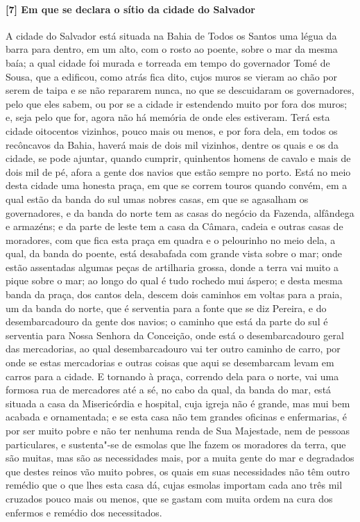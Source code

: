 \paragraph{[7] Em que se declara o sítio da cidade do Salvador} \quad
A cidade do Salvador está situada na Bahia de Todos os Santos uma légua da barra para
dentro, em um alto, com o rosto ao poente, sobre o mar da mesma baía; a qual cidade foi
murada e torreada em tempo do governador Tomé de Sousa, que a edificou, como atrás fica
dito, cujos muros se vieram ao chão por serem de taipa e se não repararem nunca, no que se
descuidaram os governadores, pelo que eles sabem, ou por se a cidade ir estendendo muito
por fora dos muros; e, seja pelo que for, agora não há memória de onde eles estiveram.
Terá esta cidade oitocentos vizinhos, pouco mais ou menos, e por fora dela, em todos os
recôncavos da Bahia, haverá mais de dois mil vizinhos, dentre os quais e os da cidade, se
pode ajuntar, quando cumprir, quinhentos homens de cavalo e mais de dois mil de pé, afora
a gente dos navios que estão sempre no porto. Está no meio desta cidade uma honesta praça,
em que se correm touros quando convém, em a qual estão da banda do sul umas nobres casas,
em que se agasalham os governadores, e da banda do norte tem as casas do negócio da
Fazenda, alfândega e armazéns; e da parte de leste tem a casa da Câmara, cadeia e outras
casas de moradores, com que fica esta praça em quadra e o pelourinho no meio dela, a qual,
da banda do poente, está desabafada com grande vista sobre o mar; onde estão assentadas
algumas peças de artilharia grossa, donde a terra vai muito a pique sobre o mar; ao longo
do qual é tudo rochedo mui áspero; e desta mesma banda da praça, dos cantos dela, descem
dois caminhos em voltas para a praia, um da banda do norte, que é serventia para a fonte
que se diz Pereira, e do desembarcadouro da gente dos navios; o caminho que está da parte
do sul é serventia para Nossa Senhora da Conceição, onde está o desembarcadouro geral das
mercadorias, ao qual desembarcadouro vai ter outro caminho de carro, por onde se estas
mercadorias e outras coisas que aqui se desembarcam levam em carros para a cidade. E
tornando à praça, correndo dela para o norte, vai uma formosa rua de mercadores até a sé,
no cabo da qual, da banda do mar, está situada a casa da Misericórdia e hospital, cuja
igreja não é grande, mas mui bem acabada e ornamentada; e se esta casa não tem grandes
oficinas e enfermarias, é por ser muito pobre e não ter nenhuma renda de Sua Majestade,
nem de pessoas particulares, e sustenta"-se de esmolas que lhe fazem os moradores da terra,
que são muitas, mas são as necessidades mais, por a muita gente do mar e degradados que
destes reinos vão muito pobres, os quais em suas necessidades não têm outro remédio que o
que lhes esta casa dá, cujas esmolas importam cada ano três mil cruzados pouco mais ou
menos, que se gastam com muita ordem na cura dos enfermos e remédio dos necessitados.

